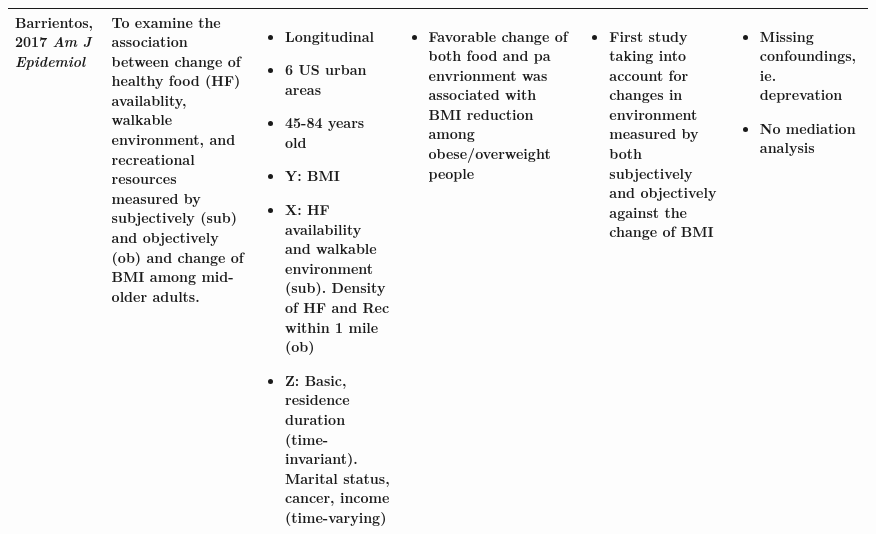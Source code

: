 \documentclass{article}
\begin{document}
\begin{longtable}[ht!]{ m{2cm} m{4cm} m{6cm} m{5cm} m{4cm} m{3cm} }
	Barrientos, 2017 \textit{Am J Epidemiol} & 
	To examine the association between change of healthy food (HF) availablity, walkable environment, and recreational resources measured by subjectively (sub) and objectively (ob) and change of BMI among mid-older adults. &
	\begin{itemize}[noitemsep,topsep=0pt] \item Longitudinal \item 6 US urban areas \item 45-84 years old \item Y: BMI \item X: HF availability and walkable environment (sub). Density of HF and Rec within 1 mile (ob) \item Z: Basic, residence duration (time-invariant). Marital status, cancer, income (time-varying) 
	\end{itemize} &
	\begin{itemize}[noitemsep,topsep=0pt] \item Favorable change of both food and pa envrionment was associated with BMI reduction among obese/overweight people 
	\end{itemize} &
	\begin{itemize}[noitemsep,topsep=0pt] \item First study taking into account for changes in environment measured by both subjectively and objectively against the change of BMI
	\end{itemize} &
	\begin{itemize}[noitemsep,topsep=0pt] \item Missing confoundings, ie. deprevation \item No mediation analysis
	\end{itemize} \\
	\hline


\end{longtable}
\end{document}
